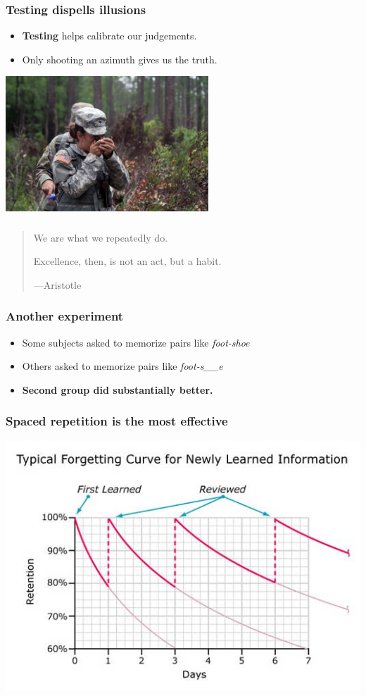 \documentclass{beamer}
\newcommand{\bi}{\begin{itemize}}
\newcommand{\li}{\item}
\newcommand{\ei}{\end{itemize}}
\newcommand{\bfr}[1]{\begin{frame}[fragile]\frametitle{{ #1 }}}
\begin{document}
\bfr{Testing dispells illusions}
\bi
\li {\bf Testing} helps calibrate our judgements.
\li Only shooting an azimuth gives us the truth.
\ei
\centerline{\includegraphics[width=3in]{shootinganazimuth.jpg}}
\end{frame}

\bfr{}


{\large
  \begin{quotation}
    We are what we repeatedly do.

    Excellence, then, is not an act, but a habit.

\hfill ---Aristotle
\end{quotation}
}


\vfill
\end{frame}

\bfr{Another experiment}
\bi
\li Some subjects asked to memorize pairs like {\em foot-shoe}
\li Others asked to memorize pairs like {\em foot-s\_\_e}
\li {\bf Second group did substantially better.}
\ei
\end{frame}
\bfr{}
\centerline{\huge{}}
\end{frame}

\bfr{Spaced repetition is the most effective}
\begin{center}
\includegraphics[width=\textwidth]{ForgettingCurve.jpg}
\end{center}
\end{frame}
\end{document}
